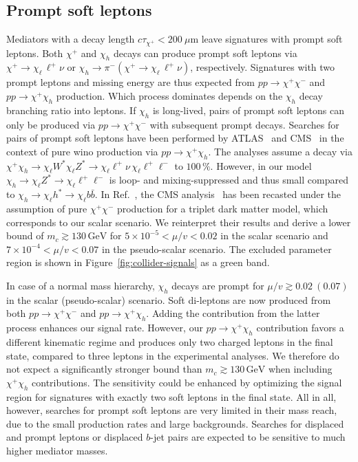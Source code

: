\documentclass[nofootinbib,prd,aps,superscriptaddress,preprintnumbers]{revtex4}
\begin{document}
\subsection{Prompt soft leptons}\noindent
Mediators with a decay length $c \tau_{\chi^+} < 200~\mu\text{m}$ leave signatures with prompt soft leptons. Both $\chi^+$ and $\chi_h$ decays can produce prompt soft leptons via $\chi^+\to \chi_\ell\,\ell^+\nu$ or $\chi_h \to \pi^-(\chi^+ \to \chi_\ell\,\ell^+\nu)$, respectively. Signatures with two prompt leptons and missing energy are thus expected from $pp\to \chi^+\chi^-$ and $pp\to \chi^+\chi_h$ production. Which process dominates depends on the $\chi_h$ decay branching ratio into leptons. If $\chi_h$ is long-lived, pairs of prompt soft leptons can only be produced via $pp\to \chi^+\chi^-$ with subsequent prompt decays. Searches for pairs of prompt soft leptons have been performed by ATLAS~\cite{Aaboud:2017leg} and CMS~\cite{Sirunyan:2018iwl} in the context of pure wino production via $pp\to \chi^+\chi_h$. The analyses assume a decay via $\chi^+\chi_h \to \chi_\ell W^\ast \chi_\ell Z^\ast \to \chi_\ell \ell^+ \nu\,\chi_\ell \ell^+\ell^-$ to $100\,\%$. However, in our model $\chi_h\to \chi_\ell Z^\ast \to \chi_\ell \ell^+\ell^-$ is loop- and mixing-suppressed and thus small compared to $\chi_h\to \chi_\ell h^\ast \to \chi_\ell b\bar{b}$. In Ref.~\cite{Bharucha:2018pfu}, the CMS analysis~\cite{Sirunyan:2018iwl} has been recasted under the assumption of pure $\chi^+\chi^-$ production for a triplet dark matter model, which corresponds to our scalar scenario. We reinterpret their results and derive a lower bound of $m_c \gtrsim 130\,\text{GeV}$ for $5\times 10^{-5} < \mu/v < 0.02$ in the scalar scenario and $7\times 10^{-4} < \mu/v < 0.07$ in the pseudo-scalar scenario. The excluded parameter region is shown in Figure~\ref{fig:collider-signals} as a green band.

In case of a normal mass hierarchy, $\chi_h$ decays are prompt for $\mu/v\gtrsim 0.02\ (0.07)$ in the scalar (pseudo-scalar) scenario. Soft di-leptons are now produced from both $pp\to \chi^+\chi^-$ and $pp\to \chi^+\chi_h$. Adding the contribution from the latter process enhances our signal rate. However, our $pp\to \chi^+\chi_h$ contribution favors a different kinematic regime and produces only two charged leptons in the final state, compared to three leptons in the experimental analyses. We therefore do not expect a significantly stronger bound than $m_c \gtrsim 130\,\text{GeV}$ when including $\chi^+\chi_h$ contributions. The sensitivity could be enhanced by optimizing the signal region for signatures with exactly two soft leptons in the final state. All in all, however, searches for prompt soft leptons are very limited in their mass reach, due to the small production rates and large backgrounds. Searches for displaced and prompt leptons or displaced $b$-jet pairs are expected to be sensitive to much higher mediator masses.\\
\end{document}
